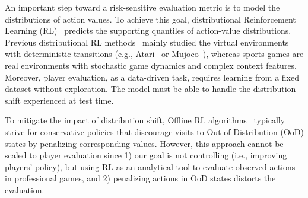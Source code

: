 \documentclass{article}
\begin{document}
An important step toward a risk-sensitive evaluation metric is to model the distributions of action values. To achieve this goal, distributional Reinforcement Learning (RL)~\cite{bdr2022} predicts the supporting quantiles of action-value distributions. Previous distributional RL methods~\cite{bellemare2017distributional,Dabney2018DistributionalRL,Mavrin2019DistributionalRL,Zhou2020NonCrossing,Zhou2021Quantile} mainly studied the virtual environments with deterministic transitions (e.g., Atari~\cite{bellemare2013arcade} or Mujoco~\cite{Todorov2012Mujoco}), whereas sports games are real environments with stochastic game dynamics and complex context features. Moreover, player evaluation, as a data-driven task, requires learning from a fixed dataset without exploration. The model must be able to handle the distribution shift experienced at test time.

To mitigate the impact of distribution shift, Offline RL algorithms~\cite{Levine2020OfflineRL} typically strive for conservative policies that discourage visits to Out-of-Distribution (OoD) states by penalizing corresponding values. However, this approach cannot be scaled to player evaluation since 1) our goal is not controlling (i.e., improving players' policy), but using RL as an analytical tool to evaluate observed actions in professional games, and 2) penalizing actions in OoD states distorts the evaluation.
\end{document}
